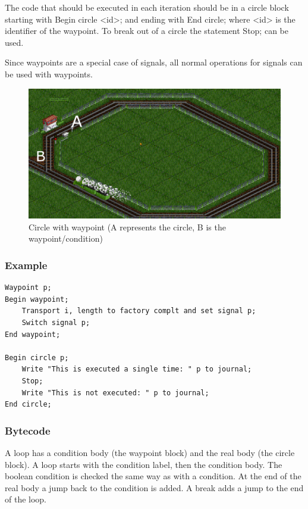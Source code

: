 \documentclass[10pt,a4paper]{article}
\newcommand{\code}[1]{{\ttfamily\small #1}}
\begin{document}
The code that should be executed in each iteration should be in a circle block starting with \code{Begin circle <id>;} and ending with \code{End circle;} where \code{<id>} is the identifier of the waypoint. To break out of a circle the statement \code{Stop;} can be used.

Since waypoints are a special case of signals, all normal operations for signals can be used with waypoints.

\begin{figure}[t]
\centering
\includegraphics[scale=0.25]{Images/circle}
\caption{Circle with waypoint (\code{A} represents the circle, \code{B} is the waypoint/condition)}
\label{fig:circle}
\end{figure}

\subsubsection*{Example}

\begin{lstlisting}
Waypoint p;
Begin waypoint;
	Transport i, length to factory complt and set signal p;
	Switch signal p;
End waypoint;

Begin circle p;
	Write "This is executed a single time: " p to journal;
	Stop;
	Write "This is not executed: " p to journal;
End circle;
\end{lstlisting}

\subsubsection*{Bytecode}

A loop has a condition body (the \code{waypoint} block) and the real body (the \code{circle} block). A loop starts with the condition label, then the condition body. The boolean condition is checked the same way as with a condition. At the end of the real body a jump back to the condition is added. A break adds a jump to the end of the loop.
\end{document}
